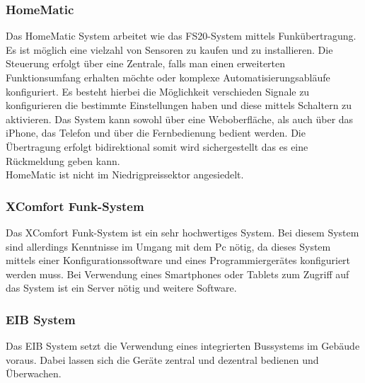 \subsubsection{HomeMatic}
Das HomeMatic System arbeitet wie das FS20-System mittels Funkübertragung. Es ist möglich eine vielzahl von Sensoren zu kaufen und zu installieren. Die Steuerung erfolgt über eine 
Zentrale, falls man einen erweiterten Funktionsumfang erhalten möchte oder komplexe Automatisierungsabläufe konfiguriert. Es besteht hierbei die Möglichkeit verschieden Signale zu konfigurieren die bestimmte Einstellungen haben und diese mittels Schaltern zu aktivieren. 
Das System kann sowohl über eine Weboberfläche, als auch über das iPhone, das Telefon und über die Fernbedienung bedient werden. Die Übertragung erfolgt bidirektional somit wird sichergestellt das es eine Rückmeldung geben kann.
\\
HomeMatic ist nicht im Niedrigpreissektor angesiedelt.

\subsubsection{XComfort Funk-System}
Das XComfort Funk-System ist ein sehr hochwertiges System. 
Bei diesem System sind allerdings Kenntnisse im Umgang mit dem Pc nötig, da dieses System mittels einer Konfigurationssoftware und eines 
Programmiergerätes konfiguriert werden muss. Bei Verwendung eines Smartphones oder Tablets zum Zugriff auf das System ist ein Server nötig und weitere Software.

\subsubsection{EIB System}
Das EIB System setzt die Verwendung eines integrierten Bussystems im Gebäude voraus. Dabei lassen sich die Geräte zentral und dezentral bedienen und Überwachen. 

